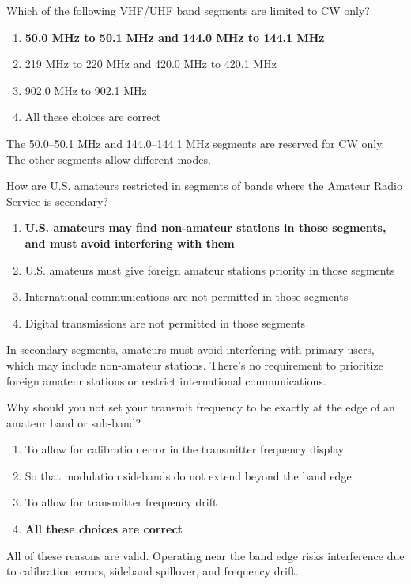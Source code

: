 \begin{tcolorbox}[colback=gray!10!white,colframe=black!75!black,title={T1B07}]
    Which of the following VHF/UHF band segments are limited to CW only?
    \begin{enumerate}[label=\Alph*),noitemsep]
        \item \textbf{50.0 MHz to 50.1 MHz and 144.0 MHz to 144.1 MHz}
        \item 219 MHz to 220 MHz and 420.0 MHz to 420.1 MHz
        \item 902.0 MHz to 902.1 MHz
        \item All these choices are correct
    \end{enumerate}
\end{tcolorbox}
The 50.0–50.1 MHz and 144.0–144.1 MHz segments are reserved for CW only. The other segments allow different modes.

\begin{tcolorbox}[colback=gray!10!white,colframe=black!75!black,title={T1B08}]
    How are U.S. amateurs restricted in segments of bands where the Amateur Radio Service is secondary?
    \begin{enumerate}[label=\Alph*),noitemsep]
        \item \textbf{U.S. amateurs may find non-amateur stations in those segments, and must avoid interfering with them}
        \item U.S. amateurs must give foreign amateur stations priority in those segments
        \item International communications are not permitted in those segments
        \item Digital transmissions are not permitted in those segments
    \end{enumerate}
\end{tcolorbox}
In secondary segments, amateurs must avoid interfering with primary users, which may include non-amateur stations. There’s no requirement to prioritize foreign amateur stations or restrict international communications.

\begin{tcolorbox}[colback=gray!10!white,colframe=black!75!black,title={T1B09}]
    Why should you not set your transmit frequency to be exactly at the edge of an amateur band or sub-band?
    \begin{enumerate}[label=\Alph*),noitemsep]
        \item To allow for calibration error in the transmitter frequency display
        \item So that modulation sidebands do not extend beyond the band edge
        \item To allow for transmitter frequency drift
        \item \textbf{All these choices are correct}
    \end{enumerate}
\end{tcolorbox}
All of these reasons are valid. Operating near the band edge risks interference due to calibration errors, sideband spillover, and frequency drift.

